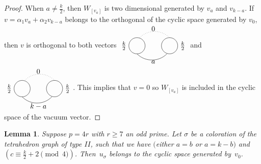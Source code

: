 \documentclass[pdftex]{sigma}
\numberwithin{equation}{section}
\newtheorem{Lemma}[Theorem]{Lemma}
\begin{document}
\begin{proof}
When $a\neq \frac{k}{2}$, then $W_{[v_a]}$ is two dimensional generated by $v_a$ and $v_{k-a}$. If $v=\alpha_1 v_a + \alpha_2 v_{k-a}$ belongs to the orthogonal of the cyclic space generated by $v_0$, then $v$ is orthogonal to both vectors
$
\tikz[scale=0.4,baseline=-0.5ex]{
\draw (-2,0) circle (1);
\draw (2,0) circle (1);
\draw (-2,-1) arc (-135: -45: 2.6);
\draw (2,1) [dotted] arc ( 45:135: 2.6);
\draw (0, 1.5) node[above]{$0$};
\draw (0, -1.5) node[below]{$a$};
\draw (-3, 0) node[left]{$\frac{k}{2}$};
\draw (3, 0) node[right]{$\frac{k}{2}$};
}$ and
$
\tikz[scale=0.4,baseline=-0.5ex]{
\draw (-2,0) circle (1);
\draw (2,0) circle (1);
\draw (-2,-1) arc (-135: -45: 2.6);
\draw (2,1) [dotted] arc ( 45:135: 2.6);
\draw (0, 1.5) node[above]{$0$};
\draw (0, -1.5) node[below]{$k-a$};
\draw (-3, 0) node[left]{$\frac{k}{2}$};
\draw (3, 0) node[right]{$\frac{k}{2}$};
}$. This implies that $v=0$ so $W_{[v_a]}$ is included in the cyclic space of the vacuum vector.
\end{proof}

\begin{Lemma} Suppose $p=4r$ with $r\geq 7$ an odd prime. Let $\sigma$ be a coloration of the tetrahedron graph of type $II$, such that we have $($either $a= b$ or $a = k-b)$ and $(c\equiv \frac{k}{2}+2 \pmod{4})$. Then~$u_{\sigma}$ belongs to the cyclic space generated by~$v_0$.
\end{Lemma}
\end{document}
